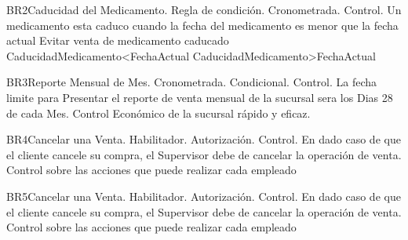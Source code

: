 \begin{BussinesRule}{BR2}{Caducidad del Medicamento.}
	\BRitem[Tipo:] Regla de condición. 
	\BRitem[Clase:] Cronometrada. 
	\BRitem[Nivel:] Control. %
	\BRitem[Descripción:] Un medicamento esta caduco cuando la fecha del medicamento es menor que la fecha actual
	\BRitem[Motivación:] Evitar venta de medicamento caducado
	 CaducidadMedicamento<FechaActual
	  CaducidadMedicamento>FechaActual
\end{BussinesRule}
\begin{BussinesRule}{BR3}{Reporte Mensual de Mes.}
	\BRitem[Tipo:] Cronometrada. 
	\BRitem[Clase:] Condicional. 
	\BRitem[Nivel:] Control. %
	\BRitem[Descripción:] La fecha limite para Presentar el reporte de venta mensual de la sucursal sera los Dias 28 de cada Mes.
	\BRitem[Motivación:]  Control Económico de la sucursal rápido y eficaz.
\end{BussinesRule}
\begin{BussinesRule}{BR4}{Cancelar una Venta.}
	\BRitem[Tipo:] Habilitador. 
	\BRitem[Clase:] Autorización. 
	\BRitem[Nivel:] Control. %
	\BRitem[Descripción:] En dado caso de que el cliente cancele su compra, el Supervisor debe de cancelar la operación de venta.
	\BRitem[Motivación:]  Control sobre las acciones que puede realizar cada empleado
\end{BussinesRule}
\begin{BussinesRule}{BR5}{Cancelar una Venta.}
	\BRitem[Tipo:] Habilitador. 
	\BRitem[Clase:] Autorización. 
	\BRitem[Nivel:] Control. %
	\BRitem[Descripción:] En dado caso de que el cliente cancele su compra, el Supervisor debe de cancelar la operación de venta.
	\BRitem[Motivación:]  Control sobre las acciones que puede realizar cada empleado
\end{BussinesRule}
